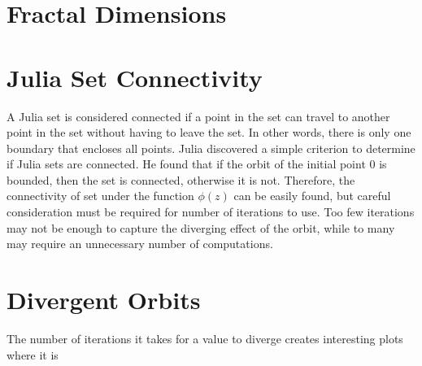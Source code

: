 \documentclass[letterpaper,11pt]{article}
\begin{document}
\section{Fractal Dimensions}

\section{Julia Set Connectivity}
A Julia set is considered connected if a point in the set can travel to another point in the set without having to leave the set. In other words, there is only one boundary that encloses all points. Julia discovered a simple criterion to determine if Julia sets are connected. He found that if the orbit of the initial point 0 is bounded, then the set is connected, otherwise it is not. Therefore, the connectivity of set under the function $\phi(z)$ can be easily found, but careful consideration must be required for number of iterations to use. Too few iterations may not be enough to capture the diverging effect of the orbit, while to many may require an unnecessary number of computations.

\section{Divergent Orbits}
The number of iterations it takes for a value to diverge creates interesting plots where it is 
\end{document}
